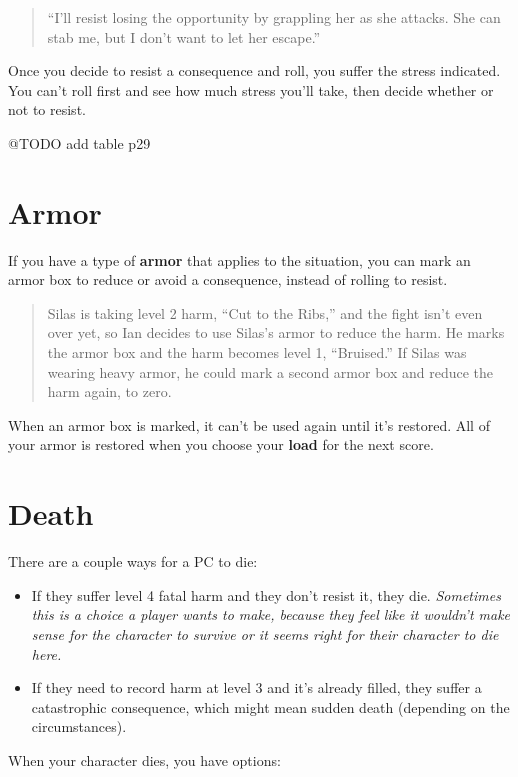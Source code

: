 \documentclass[11pt,oneside]{book}
\begin{document}
\begin{quote}
	“I’ll resist losing the opportunity by grappling her as she attacks. She can stab me, but I don’t want to let her escape.”
\end{quote}

Once you decide to resist a consequence and roll, you suffer the stress indicated. You can’t roll first and see how much stress you’ll take, then decide whether or not to resist.

@TODO add table p29

\section{Armor}

If you have a type of \textbf{armor} that applies to the situation, you can mark an armor box to reduce or avoid a consequence, instead of rolling to resist.

\begin{quote}
Silas is taking level 2 harm, “Cut to the Ribs,” and the fight isn’t even over yet, so Ian decides to use Silas’s armor to reduce the harm. He marks the armor box and the harm becomes level 1, “Bruised.” If Silas was wearing heavy armor, he could mark a second armor box and reduce the harm again, to zero.
\end{quote}

When an armor box is marked, it can’t be used again until it’s restored. All of your armor is restored when you choose your \textbf{load} for the next score.

\section{Death}

There are a couple ways for a PC to die:

\begin{itemize}
	\item If they suffer level 4 fatal harm and they don’t resist it, they die. \emph{Sometimes this is a choice a player wants to make, because they feel like it wouldn’t make sense for the character to survive or it seems right for their character to die here.}
	\item If they need to record harm at level 3 and it’s already filled, they suffer a catastrophic consequence, which might mean sudden death (depending on the circumstances).
\end{itemize}

When your character dies, you have options:
\end{document}
